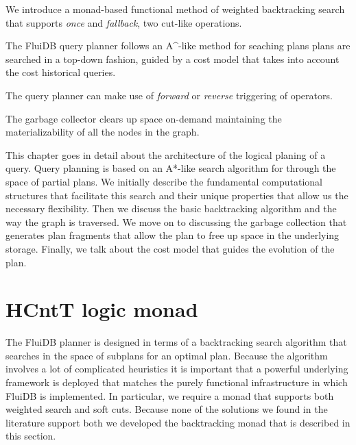 
\begin{summary}
\item We introduce a monad-based functional method of weighted
  backtracking search that supports \emph{once} and \emph{fallback},
  two cut-like operations.
\item The FluiDB query planner follows an A^{\star}-like method for
  seaching plans plans are searched in a top-down fashion, guided by a
  cost model that takes into account the cost historical queries.
\item The query planner can make use of \emph{forward} or
  \emph{reverse} triggering of operators.
\item The garbage collector clears up space on-demand maintaining the
  materializability of all the nodes in the graph.
\end{summary}

This chapter goes in detail about the architecture of the logical
planing of a query. Query planning is based on an A*-like search
algorithm for through the space of partial plans. We initially
describe the fundamental computational structures that facilitate this
search and their unique properties that allow us the necessary
flexibility. Then we discuss the basic backtracking algorithm and the
way the graph is traversed. We move on to discussing the garbage
collection that generates plan fragments that allow the plan to free
up space in the underlying storage. Finally, we talk about the cost
model that guides the evolution of the plan.

\section{HCntT logic monad}

The FluiDB planner is designed in terms of a backtracking search
algorithm that searches in the space of subplans for an optimal
plan. Because the algorithm involves a lot of complicated heuristics
it is important that a powerful underlying framework is deployed that
matches the purely functional infrastructure in which FluiDB is
implemented.  In particular, we require a monad that supports both
weighted search and soft cuts. Because none of the solutions we found
in the literature support both we developed the 
backtracking monad that is described in this section.

